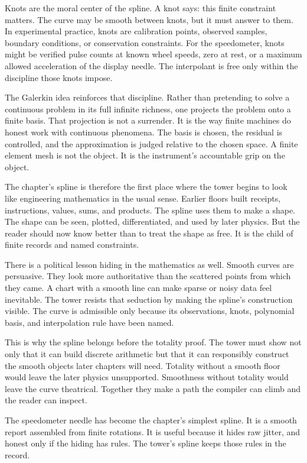 Knots are the moral center of the spline. A knot says: this finite constraint
matters. The curve may be smooth between knots, but it must answer to them. In
experimental practice, knots are calibration points, observed samples, boundary
conditions, or conservation constraints. For the speedometer, knots might be
verified pulse counts at known wheel speeds, zero at rest, or a maximum
allowed acceleration of the display needle. The interpolant is free only within
the discipline those knots impose.

The Galerkin idea reinforces that discipline. Rather than pretending to solve
a continuous problem in its full infinite richness, one projects the problem
onto a finite basis. That projection is not a surrender. It is the way finite
machines do honest work with continuous phenomena. The basis is chosen, the
residual is controlled, and the approximation is judged relative to the chosen
space. A finite element mesh is not the object. It is the instrument's
accountable grip on the object.

The chapter's spline is therefore the first place where the tower begins to
look like engineering mathematics in the usual sense. Earlier floors built
receipts, instructions, values, sums, and products. The spline uses them to
make a shape. The shape can be seen, plotted, differentiated, and used by
later physics. But the reader should now know better than to treat the shape as
free. It is the child of finite records and named constraints.

There is a political lesson hiding in the mathematics as well. Smooth curves
are persuasive. They look more authoritative than the scattered points from
which they came. A chart with a smooth line can make sparse or noisy data feel
inevitable. The tower resists that seduction by making the spline's
construction visible. The curve is admissible only because its observations,
knots, polynomial basis, and interpolation rule have been named.

This is why the spline belongs before the totality proof. The tower must show
not only that it can build discrete arithmetic but that it can responsibly
construct the smooth objects later chapters will need. Totality without a
smooth floor would leave the later physics unsupported. Smoothness without
totality would leave the curve theatrical. Together they make a path the
compiler can climb and the reader can inspect.

The speedometer needle has become the chapter's simplest spline. It is a
smooth report assembled from finite rotations. It is useful because it hides
raw jitter, and honest only if the hiding has rules. The tower's spline keeps
those rules in the record.

